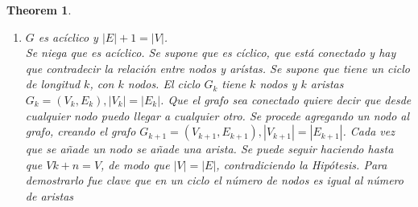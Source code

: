 \documentclass[12pt, fleqn]{article}
\newtheorem{theorem}{Theorem}[section]
\theoremstyle{definition}
\begin{document}
\begin{theorem}
\begin{enumerate}
\begin{proof}
\begin{enumerate}
                                \item Hipótesis de inducción: se supone que el predicado es válido para $k$ aristas. El predicado es que la relación entre nodos y aristas
                                    es  $|E| + 1 = |V| $. Se supone que está conectado y si se quita cualquier arista se desconecta el grafo.
                                \item Se toma cualquier grafo de $k+1$ aristas. Por la Hipótesis se que si se quita una arista se desconecta y quedan
                                    $G_1=(V_1, E_1)$ y  $G_2=(V_2, E_2)$ donde $ 0 \leq |E_1|, |E_2| \leq k$ Lo que queda de los dos lados debe tener
                                    $k$ o menos de $k$ aristas.
                                \item se aplica inducción fuerte.
                                    \begin{align*}
                                        |V| &= |V_1| + |V_2|\\
                                        |V| &= (|E_1| + 1) + (|E_2| + 1)\\
                                        |V| &= (|E_1| + |E_2| +1) + 1\\
                                        |V| &= |E| + 1
                                    \end{align*}
                            \end{enumerate}
                        \end{proof}
                    \item $G$ es acíclico y $|E| + 1 = |V|$. \\ \emph{ Se niega que es acíclico. Se supone que es cíclico, que está conectado y hay
                                que contradecir la relación entre nodos y arístas. Se supone que tiene un ciclo de longitud $k$, con $k$ nodos.
                                El ciclo $G_k$ tiene $k$ nodos y $k$ aristas $G_k=(V_k, E_k), |V_k| = |E_k| $. Que el grafo sea conectado quiere decir que
                                desde cualquier nodo puedo llegar a cualquier otro. Se procede agregando un nodo al grafo, creando el grafo
                                $G_{k+1} = (V_{k+1}, E_{k+1}), |V_{k+1}| = |E_{k+1}| $. Cada vez que se añade un nodo se añade una arista.
                                Se puede seguir haciendo hasta que $V{k+n} = V$, de modo que $|V| = |E|$, contradiciendo la Hipótesis. Para demostrarlo fue clave
                                que en un ciclo el número de nodos es igual al número de aristas }

\end{enumerate}
\end{theorem}
\end{document}
